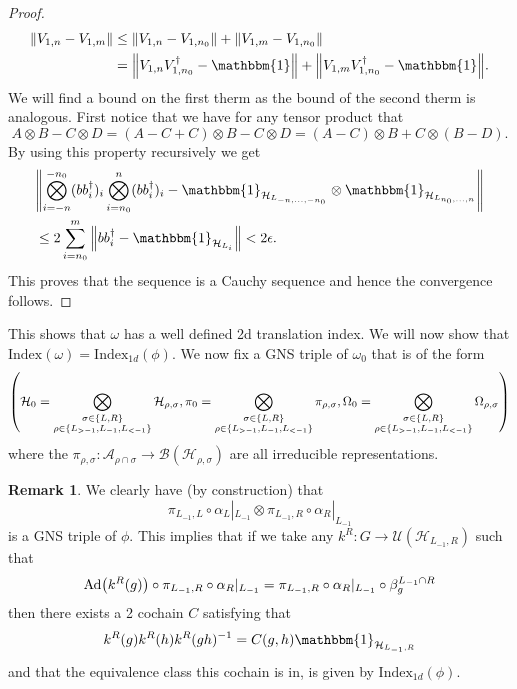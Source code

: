 \documentclass[12pt,a4paper,twoside]{article}
\let\originalleft\left
\let\originalright\right
\renewcommand{\left}{\mathopen{}\mathclose\bgroup\originalleft}
\renewcommand{\right}{\aftergroup\egroup\originalright}
\newcommand{\UU}{\mathcal U}
\newcommand{\BB}{\mathcal B}
\newcommand{\HH}{\mathcal H}
\renewcommand{\AA}{\mathcal A}
\newcommand{\id}{\mathbbm{1}}
\newcommand{\Ad}[1]{\textrm{Ad}\left(#1\right)}
\theoremstyle{definition}
\newtheorem{remark}[theorem]{Remark}
\numberwithin{equation}{section}
\begin{document}
\begin{proof}
	\begin{align}
		\norm{V_{1,n}-V_{1,m}}&\leq \norm{V_{1,n}-V_{1,n_0}}+\norm{V_{1,m}-V_{1,n_0}}\\
		&=\norm{V_{1,n}V_{1,n_0}^\dagger-\id}+\norm{V_{1,m}V_{1,n_0}^\dagger-\id}.
	\end{align}
	We will find a bound on the first therm as the bound of the second therm is analogous. First notice that we have for any tensor product that
	\begin{equation}
		A\otimes B-C\otimes D=(A-C+C)\otimes B-C\otimes D=(A-C)\otimes B+C\otimes (B-D).
	\end{equation}
	By using this property recursively we get
	\begin{align}
	&\norm{\bigotimes_{i=-n}^{-n_0}(bb_i^\dagger)_i\bigotimes_{i=n_0}^{n}(bb_i^\dagger)_i-\id_{\HH_{L_{-n,\ldots,-n_0}}}\otimes\id_{\HH_{L_{n_0,\ldots,n}}}}\\
	&\leq 2\sum_{i=n_0}^{m}\norm{bb_i^\dagger-\id_{\HH_{L_i}}}<2\epsilon.
	\end{align}
	This proves that the sequence is a Cauchy sequence and hence the convergence follows.
\end{proof}
This shows that $\omega$ has a well defined 2d translation index. We will now show that $\textrm{Index}(\omega)=\textrm{Index}_{1d}(\phi)$. We now fix a GNS triple of $\omega_0$ that is of the form
\begin{equation}
	\left(\HH_0=\bigotimes_{\substack{\sigma\in\{L,R\}\\ \rho\in\{L_{>-1},L_{-1},L_{<-1}\}}}\HH_{\rho,\sigma},\pi_0=\bigotimes_{\substack{\sigma\in\{L,R\}\\ \rho\in\{L_{>-1},L_{-1},L_{<-1}\}}}\pi_{\rho,\sigma},\Omega_0=\bigotimes_{\substack{\sigma\in\{L,R\}\\ \rho\in\{L_{>-1},L_{-1},L_{<-1}\}}}\Omega_{\rho,\sigma}\right)
\end{equation}
where the $\pi_{\rho,\sigma}:\AA_{\rho\cap\sigma}\rightarrow\BB(\HH_{\rho,\sigma})$ are all irreducible representations.
\begin{remark}\label{rem:GNS_One_Dimensional}
	We clearly have (by construction) that
	\begin{equation}
		\pi_{L_{-1},L}\circ\alpha_L|_{L_{-1}}\otimes \pi_{L_{-1},R}\circ\alpha_R|_{L_{-1}}
	\end{equation}
	is a GNS triple of $\phi$. This implies that if we take any $k^R:G\rightarrow \UU(\HH_{L_{-1},R})$ such that
	\begin{equation}
		\Ad{k^R(g)}\circ\pi_{L_{-1},R}\circ\alpha_R|_{L_{-1}}=\pi_{L_{-1},R}\circ\alpha_R|_{L_{-1}}\circ\beta_{g}^{L_{-1}\cap R}
	\end{equation}
	then there exists a 2 cochain $C$ satisfying that
	\begin{equation}
		k^R(g)k^R(h)k^R(gh)^{-1}=C(g,h)\id_{\HH_{L_{-1},R}}
	\end{equation}
	and that the equivalence class this cochain is in, is given by $\textrm{Index}_{1d}(\phi)$.
\end{remark}
\end{document}
